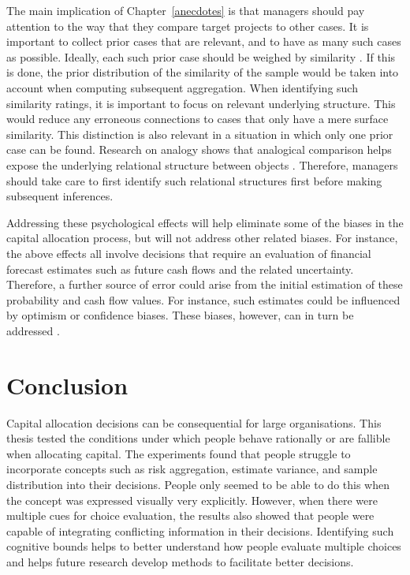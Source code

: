 \documentclass[a4paper, nobind, dvipsnames]{templates/ociamthesis}
\theoremstyle{definition}
\theoremstyle{definition}
\theoremstyle{definition}
\theoremstyle{definition}
\theoremstyle{remark}
\begin{document}
The main implication of Chapter~\ref{anecdotes} is that managers should pay
attention to the way that they compare target projects to other cases. It is
important to collect prior cases that are relevant, and to have as many such
cases as possible. Ideally, each such prior case should be weighed by similarity
\autocite{lovallo2012}. If this is done, the prior distribution of the similarity of the
sample would be taken into account when computing subsequent aggregation. When
identifying such similarity ratings, it is important to focus on relevant
underlying structure. This would reduce any erroneous connections to cases that
only have a mere surface similarity. This distinction is also relevant in a
situation in which only one prior case can be found. Research on analogy shows
that analogical comparison helps expose the underlying relational structure
between objects \autocites[e.g.,][]{kurtz2013,markman1993}. Therefore, managers should
take care to first identify such relational structures first before making
subsequent inferences.

Addressing these psychological effects will help eliminate some of the biases in
the capital allocation process, but will not address other related biases. For
instance, the above effects all involve decisions that require an evaluation of
financial forecast estimates such as future cash flows and the related
uncertainty. Therefore, a further source of error could arise from the initial
estimation of these probability and cash flow values. For instance, such
estimates could be influenced by optimism or confidence biases. These biases,
however, can in turn be addressed \autocite{flyvbjerg2018}.

\hypertarget{conclusion}{%
\section{Conclusion}\label{conclusion}}

Capital allocation decisions can be consequential for large organisations. This
thesis tested the conditions under which people behave rationally or are
fallible when allocating capital. The experiments found that people struggle to
incorporate concepts such as risk aggregation, estimate variance, and sample
distribution into their decisions. People only seemed to be able to do this when
the concept was expressed visually very explicitly. However, when there were
multiple cues for choice evaluation, the results also showed that people were
capable of integrating conflicting information in their decisions. Identifying
such cognitive bounds helps to better understand how people evaluate multiple
choices and helps future research develop methods to facilitate better
decisions.
\end{document}
